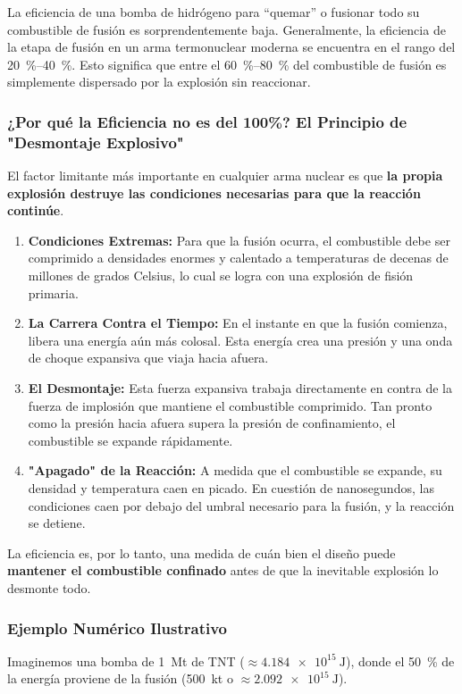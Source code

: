\documentclass[11pt,a4paper]{article}
\begin{document}
\begin{enumerate}
La eficiencia de una bomba de hidrógeno para ``quemar'' o fusionar todo su combustible de fusión es sorprendentemente baja. Generalmente, la eficiencia de la etapa de fusión en un arma termonuclear moderna se encuentra en el rango del \SIrange{20}{40}{\percent}. Esto significa que entre el \SIrange{60}{80}{\percent} del combustible de fusión es simplemente dispersado por la explosión sin reaccionar.

\subsubsection*{¿Por qué la Eficiencia no es del 100\%? El Principio de "Desmontaje Explosivo"}

El factor limitante más importante en cualquier arma nuclear es que \textbf{la propia explosión destruye las condiciones necesarias para que la reacción continúe}.
\begin{enumerate}
    \item \textbf{Condiciones Extremas:} Para que la fusión ocurra, el combustible debe ser comprimido a densidades enormes y calentado a temperaturas de decenas de millones de grados Celsius, lo cual se logra con una explosión de fisión primaria.
    \item \textbf{La Carrera Contra el Tiempo:} En el instante en que la fusión comienza, libera una energía aún más colosal. Esta energía crea una presión y una onda de choque expansiva que viaja hacia afuera.
    \item \textbf{El Desmontaje:} Esta fuerza expansiva trabaja directamente en contra de la fuerza de implosión que mantiene el combustible comprimido. Tan pronto como la presión hacia afuera supera la presión de confinamiento, el combustible se expande rápidamente.
    \item \textbf{"Apagado" de la Reacción:} A medida que el combustible se expande, su densidad y temperatura caen en picado. En cuestión de nanosegundos, las condiciones caen por debajo del umbral necesario para la fusión, y la reacción se detiene.
\end{enumerate}
La eficiencia es, por lo tanto, una medida de cuán bien el diseño puede \textbf{mantener el combustible confinado} antes de que la inevitable explosión lo desmonte todo.

\subsubsection*{Ejemplo Numérico Ilustrativo}
Imaginemos una bomba de \SI{1}{\mega\tonne} de TNT ($\approx \SI{4.184e15}{\joule}$), donde el \SI{50}{\percent} de la energía proviene de la fusión (\SI{500}{\kilo\tonne} o $\approx \SI{2.092e15}{\joule}$).


\end{enumerate}
\end{document}
